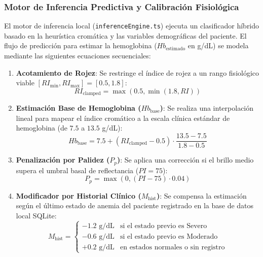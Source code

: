 \subsubsection{Motor de Inferencia Predictiva y Calibración Fisiológica}
El motor de inferencia local (\texttt{inferenceEngine.ts}) ejecuta un clasificador híbrido basado en la heurística cromática y las variables demográficas del paciente. El flujo de predicción para estimar la hemoglobina ($Hb_{\text{estimado}}$ en g/dL) se modela mediante las siguientes ecuaciones secuenciales:

\begin{enumerate}
    \item \textbf{Acotamiento de Rojez}: Se restringe el índice de rojez a un rango fisiológico viable $[RI_{\text{min}}, RI_{\text{max}}] = [0.5, 1.8]$:
    \begin{equation}
        RI_{\text{clamped}} = \max(0.5, \min(1.8, RI))
    \end{equation}
    \item \textbf{Estimación Base de Hemoglobina ($Hb_{\text{base}}$)}: Se realiza una interpolación lineal para mapear el índice cromático a la escala clínica estándar de hemoglobina (de $7.5$ a $13.5$ g/dL):
    \begin{equation}
        Hb_{\text{base}} = 7.5 + (RI_{\text{clamped}} - 0.5) \cdot \frac{13.5 - 7.5}{1.8 - 0.5}
    \end{equation}
    \item \textbf{Penalización por Palidez ($P_p$)}: Se aplica una corrección si el brillo medio supera el umbral basal de reflectancia ($PI = 75$):
    \begin{equation}
        P_p = \max\left(0, (PI - 75) \cdot 0.04\right)
    \end{equation}
    \item \textbf{Modificador por Historial Clínico ($M_{\text{hist}}$)}: Se compensa la estimación según el último estado de anemia del paciente registrado en la base de datos local SQLite:
    \begin{equation}
        M_{\text{hist}} = \begin{cases} 
            -1.2 \text{ g/dL} & \text{si el estado previo es Severo} \\
            -0.6 \text{ g/dL} & \text{si el estado previo es Moderado} \\
            +0.2 \text{ g/dL} & \text{en estados normales o sin registro}
        \end{cases}
    \end{equation}

\end{enumerate}

